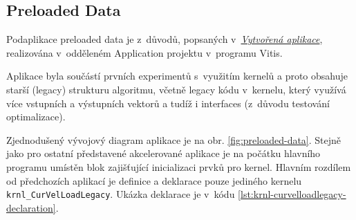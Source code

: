 \documentclass[a4paper, twoside, 11pt]{article}
\newcommand{\fbar}{\FloatBarrier}
\begin{document}
		



	   \fbar
	   \subsection{Preloaded Data}\label{subsec:preloaded-data}
	   Podaplikace preloaded data je z~důvodů, popsaných v~\hyperref[sec:vytvorena-aplikace]{\textit{Vytvořená aplikace}}, realizována v~odděleném Application projektu v~programu Vitis.\par
	   Aplikace byla součástí prvních experimentů s~využitím kernelů a proto obsahuje starší (legacy) strukturu algoritmu, včetně legacy kódu v~kernelu, který využívá více vstupních a výstupních vektorů a tudíž i interfaces (z~důvodu testování optimalizace).\par
	   Zjednodušený vývojový diagram aplikace je na obr. \ref{fig:preloaded-data}. Stejně jako pro ostatní představené akcelerované aplikace je na počátku hlavního programu umístěn blok zajišťující inicializaci prvků pro kernel. Hlavním rozdílem od předchozích aplikací je definice a deklarace pouze jediného kernelu\\ \texttt{krnl\_CurVelLoadLegacy}. Ukázka deklarace je v~kódu \ref{lst:krnl-curvelloadlegacy-declaration}.\par
\end{document}
